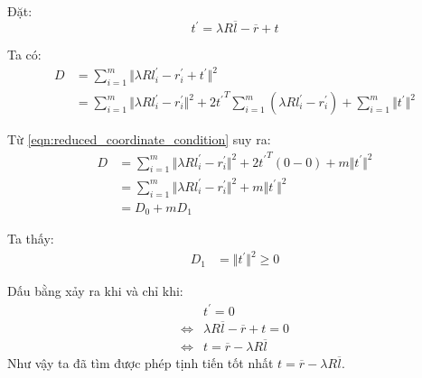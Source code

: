 \documentclass[../../main.tex]{subfiles}
\begin{document}
Đặt:
\begin{equation}
    t^{\prime} = \lambda R \overline{l} - \overline{r} + t
\end{equation}

Ta có:
\begin{equation}
    \begin{split}
        D &= \sum_{i = 1}^{m} \Vert \lambda R l^{\prime}_i - r^{\prime}_i + t^{\prime} \Vert ^2 \\
          &= \sum_{i = 1}^{m} \Vert \lambda R l^{\prime}_i - r^{\prime}_i \Vert ^2 + 2{t^{\prime}}^T\sum_{i = 1}^{m} ( \lambda R l^{\prime}_i - r^{\prime}_i ) + \sum_{i = 1}^{m}\Vert t^{\prime} \Vert^2
    \end{split}
\end{equation}

Từ \ref{eqn:reduced_coordinate_condition} suy ra:
\begin{equation}
    \begin{split}
        D &= \sum_{i = 1}^{m} \Vert \lambda R l^{\prime}_i - r^{\prime}_i \Vert ^2 + 2{t^{\prime}}^T(0-0) + m\Vert t^{\prime} \Vert^2 \\ 
          &=  \sum_{i = 1}^{m} \Vert \lambda R l^{\prime}_i - r^{\prime}_i \Vert ^2 + m\Vert t^{\prime} \Vert^2 \\
          &= D_0 + mD_1
    \end{split}
\end{equation}

Ta thấy:
\begin{equation}
    \begin{split}
        D_1 &= \Vert t^{\prime} \Vert^2 \geq 0
    \end{split}
\end{equation}

Dấu bằng xảy ra khi và chỉ khi:
\begin{equation}
    \begin{split}
        & t^{\prime} = 0 \\
        \Leftrightarrow & \lambda R \overline{l} - \overline{r} + t = 0 \\
        \Leftrightarrow &t = \overline{r} - \lambda R \overline{l} 
    \end{split}
\end{equation}
Như vậy ta đã tìm được phép tịnh tiến tốt nhất $t = \overline{r} - \lambda R \overline{l} $.
\end{document}
